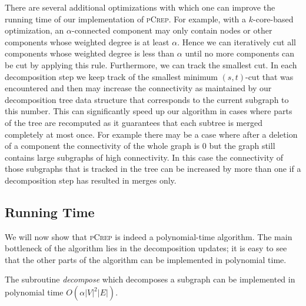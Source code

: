 \documentclass[a4paper,UKenglish,cleveref, autoref, thm-restate,authorcolumns]{../lipics/lipics-v2019}
\newcommand{\adjDel}{\textsc{pCrep}}
\begin{document}

There are several additional optimizations 
with which one can improve the running time of our implementation of \adjDel{}.
For example, with a $k$-core-based optimization, 
an $\alpha$-connected component 
	may only contain nodes or other components whose weighted degree is at least 
	$\alpha$. Hence we can iteratively cut all components whose weighted degree is 
	less than $\alpha$ until no more components can be cut by applying this rule.
Furthermore, we can track the smallest cut.
	In each decomposition step we keep track of the smallest minimum $(s,t)$-cut 
	that was encountered and then may increase the connectivity as maintained by 
	our decomposition tree data structure that corresponds to the current subgraph 
	to this number. This can significantly speed up our algorithm in cases where 
	parts of the tree are recomputed as it guarantees that each subtree is merged 
	completely at most once. For example there may be a case where after a deletion 
	of a component the connectivity of the whole graph is 0 but the graph still 
	contains large subgraphs of high connectivity. In this case the connectivity 
	of those subgraphs that is tracked in the tree can be increased by more than 
	one if a decomposition step has resulted in merges only.

\subsection{Running Time}
\label{run_time_sec}

We will now show that \adjDel{} is indeed a polynomial-time
algorithm.
The main bottleneck of the algorithm lies in the decomposition updates;
it is easy to see that 
the other parts of the algorithm can be implemented in polynomial time.

\begin{lemma}
	\label{dec_run_time_lem}
	The subroutine \textit{decompose} which decomposes a subgraph can be implemented in polynomial time $O(\alpha|V|^2|E|)$.
\end{lemma}
\end{document}
